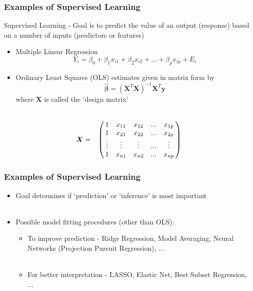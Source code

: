 \documentclass[hide notes,red,handout]{beamer}
\begin{document}
\begin{frame}[t]
\frametitle{Examples of Supervised Learning}
Supervised Learning - Goal is to predict the value of an output (response) based on a number of inputs (predictors or features)\\
\begin{itemize}
\item Multiple Linear Regression
$$Y_i = \beta_0+\beta_1x_{i1}+\beta_2x_{i2}+...+\beta_px_{ip}+E_i$$\pause
\item Ordinary Least Squares (OLS) estimates given in matrix form by 
$$\hat{\boldsymbol{\beta}}=(\boldsymbol{X}^{T}\boldsymbol{X})^{-1}\boldsymbol{X}^{T}\textbf{y}$$
where $\textbf{X}$ is called the `design matrix'
\end{itemize}
\[
\boldsymbol{X}=
\bordermatrix{~& & & & &\cr
~&1 & x_{11} & x_{12} &... &x_{1p} \cr
~&1 & x_{21} & x_{22} &... &x_{2p} \cr
~&\vdots & \vdots & \vdots &... &\vdots \cr
~&1 & x_{n1} & x_{n2} &... &x_{np}}
\]
\end{frame}

\begin{frame}[t]
\frametitle{Examples of Supervised Learning}
\begin{itemize}
\item Goal determines if `prediction' or `inference' is most important\\~\\
\item Possible model fitting procedures (other than OLS): \\\pause
\begin{itemize}
\item To improve prediction - Ridge Regression, Model Averaging, Neural Networks (Projection Pursuit Regression), ...\\~\\\pause
\item For better interpretation - LASSO, Elastic Net, Best Subset Regression, ...
\end{itemize}
\end{itemize}
\end{frame}
\end{document}
